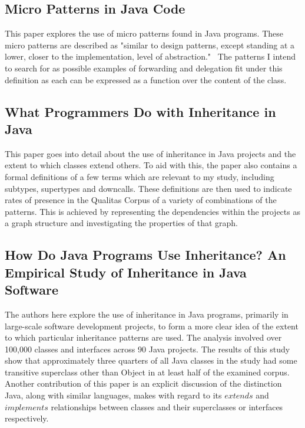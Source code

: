 \subsection{Micro Patterns in Java Code~\cite{JavaMicropatterns}}
This paper explores the use of micro patterns found in Java programs. These micro patterns are described as "similar to design patterns, except standing at a lower, closer to the implementation, level of abstraction."~\cite{JavaMicropatterns}\newline
The patterns I intend to search for as possible examples of forwarding and delegation fit under this definition as each can be expressed as a function over the content of the class.

\subsection{What Programmers Do with Inheritance in Java~\cite{InheritanceInJava}}
This paper goes into detail about the use of inheritance in Java projects and the extent to which classes extend others. To aid with this, the paper also contains a formal definitions of a few terms which are relevant to my study, including subtypes, supertypes and downcalls. These definitions are then used to indicate rates of presence in the Qualitas Corpus of a variety of combinations of the patterns. This is achieved by representing the dependencies within the projects as a graph structure and investigating the properties of that graph.

\subsection{How Do Java Programs Use Inheritance? An Empirical Study of Inheritance in Java Software~\cite{HowProgramsUseInheritance}}
The authors here explore the use of inheritance in Java programs, primarily in large-scale software development projects, to form a more clear idea of the extent to which particular inheritance patterns are used. The analysis involved over 100,000 classes and interfaces across 90 Java projects. The results of this study show that approximately three quarters of all Java classes in the study had some transitive superclass other than Object in at least half of the examined corpus. \newline
Another contribution of this paper is an explicit discussion of the distinction Java, along with similar languages, makes with regard to its $extends$ and $implements$ relationships between classes and their superclasses or interfaces respectively.

